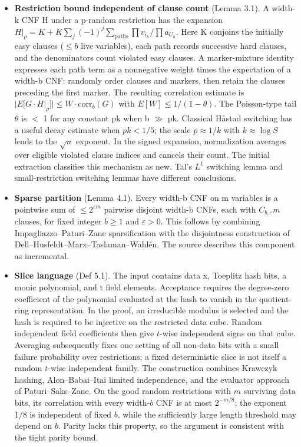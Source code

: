 \documentclass[11pt]{article}
\begin{document}
\begin{itemize}
\item \textbf{Restriction bound independent of clause count} (Lemma 3.1). A width-k CNF H under a p-random restriction has the expansion $H|_\rho=K+K\sum_j(-1)^j\sum_{\text{paths}}\prod v_{i_h}/\prod a_{U_h}$. Here K conjoins the initially easy clauses ($\le b$ live variables), each path records successive hard clauses, and the denominators count violated easy clauses. A marker-mixture identity expresses each path term as a nonnegative weight times the expectation of a width-b CNF: randomly order clauses and markers, then retain the clauses preceding the first marker. The resulting correlation estimate is $|E[G\cdot H|_\rho]|\le W\cdot\mathrm{corr}_b(G)$ with $E[W]\le1/(1-\theta)$. The Poisson-type tail $\theta$ is $<$ 1 for any constant pk when b $\gg$ pk. Classical Håstad switching has a useful decay estimate when $pk<1/5$; the scale $p\approx1/k$ with $k\approx\log S$ leads to the $\sqrt{n}$ exponent. In the signed expansion, normalization averages over eligible violated clause indices and cancels their count. The initial extraction classifies this mechanism as new. Tal\textquoteright{}s $L^{1}$ switching lemma and small-restriction switching lemmas have different conclusions.
\item \textbf{Sparse partition} (Lemma 4.1). Every width-b CNF on m variables is a pointwise sum of $\le 2^{\varepsilon m}$ pairwise disjoint width-b CNFs, each with $C_{b,\varepsilon}m$ clauses, for fixed integer $b\ge1$ and $\varepsilon>0$. This follows by combining Impagliazzo--Paturi--Zane sparsification with the disjointness construction of Dell--Husfeldt--Marx--Taslaman--Wahlén. The source describes this component as incremental.
\item \textbf{Slice language} (Def 5.1). The input contains data x, Toeplitz hash bits, a monic polynomial, and t field elements. Acceptance requires the degree-zero coefficient of the polynomial evaluated at the hash to vanish in the quotient-ring representation. In the proof, an irreducible modulus is selected and the hash is required to be injective on the restricted data cube. Random independent field coefficients then give $t$-wise independent signs on that cube. Averaging subsequently fixes one setting of all non-data bits with a small failure probability over restrictions; a fixed deterministic slice is not itself a random $t$-wise independent family. The construction combines Krawczyk hashing, Alon--Babai--Itai limited independence, and the evaluator approach of Paturi--Saks--Zane. On the good random restrictions with $m$ surviving data bits, its correlation with every width-$b$ CNF is at most $2^{-m/8}$; the exponent $1/8$ is independent of fixed $b$, while the sufficiently large length threshold may depend on $b$. Parity lacks this property, so the argument is consistent with the tight parity bound.
\end{itemize}
\end{document}
